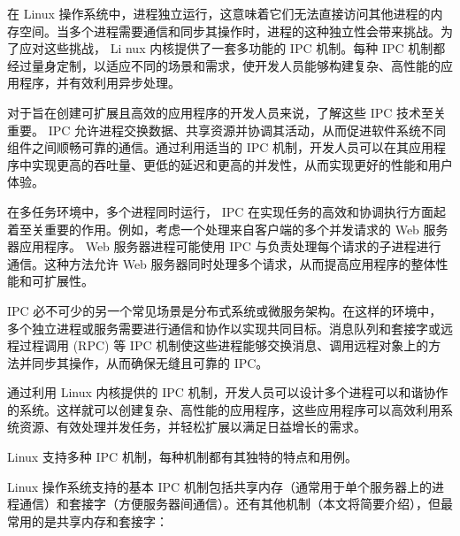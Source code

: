 
在 Linux 操作系统中，进程独立运行，这意味着它们无法直接访问其他进程的内存空间。当多个进程需要通信和同步其操作时，进程的这种独立性会带来挑战。为了应对这些挑战， Li nux 内核提供了一套多功能的 IPC 机制。每种 IPC 机制都经过量身定制，以适应不同的场景和需求，使开发人员能够构建复杂、高性能的应用程序，并有效利用异步处理。

对于旨在创建可扩展且高效的应用程序的开发人员来说，了解这些 IPC 技术至关重要。 IPC 允许进程交换数据、共享资源并协调其活动，从而促进软件系统不同组件之间顺畅可靠的通信。通过利用适当的 IPC 机制，开发人员可以在其应用程序中实现更高的吞吐量、更低的延迟和更高的并发性，从而实现更好的性能和用户体验。

在多任务环境中，多个进程同时运行， IPC 在实现任务的高效和协调执行方面起着至关重要的作用。例如，考虑一个处理来自客户端的多个并发请求的 Web 服务器应用程序。 Web 服务器进程可能使用 IPC 与负责处理每个请求的子进程进行通信。这种方法允许 Web 服务器同时处理多个请求，从而提高应用程序的整体性能和可扩展性。

IPC 必不可少的另一个常见场景是分布式系统或微服务架构。在这样的环境中，多个独立进程或服务需要进行通信和协作以实现共同目标。消息队列和套接字或远程过程调用 (RPC) 等 IPC 机制使这些进程能够交换消息、调用远程对象上的方法并同步其操作，从而确保无缝且可靠的 IPC。

通过利用 Linux 内核提供的 IPC 机制，开发人员可以设计多个进程可以和谐协作的系统。这样就可以创建复杂、高性能的应用程序，这些应用程序可以高效利用系统资源、有效处理并发任务，并轻松扩展以满足日益增长的需求。


Linux 支持多种 IPC 机制，每种机制都有其独特的特点和用例。

Linux 操作系统支持的基本 IPC 机制包括共享内存（通常用于单个服务器上的进程通信）和套接字（方便服务器间通信）。还有其他机制（本文将简要介绍），但最常用的是共享内存和套接字：

